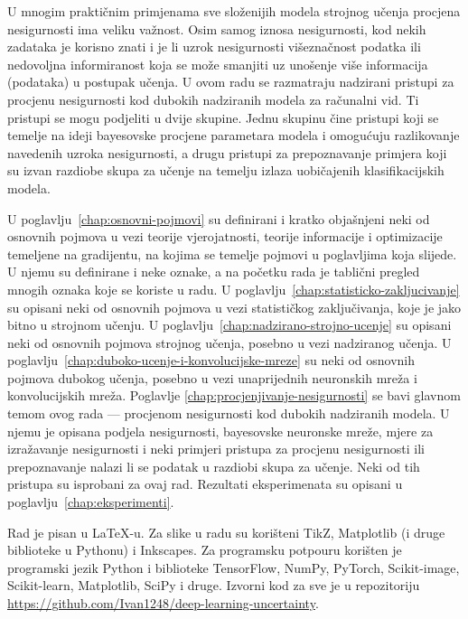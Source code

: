 \documentclass[utf8, diplomski, lmodern]{fer}
\begin{document}
U mnogim praktičnim primjenama sve složenijih modela strojnog učenja procjena nesigurnosti ima veliku važnost. Osim samog iznosa nesigurnosti, kod nekih zadataka je korisno znati i je li uzrok nesigurnosti višeznačnost podatka ili nedovoljna informiranost koja se može smanjiti uz unošenje više informacija (podataka) u postupak učenja. U ovom radu se razmatraju nadzirani pristupi za procjenu nesigurnosti kod dubokih nadziranih modela za računalni vid. Ti pristupi se mogu podjeliti u dvije skupine. Jednu skupinu čine pristupi koji se temelje na ideji bayesovske procjene parametara modela i omogućuju razlikovanje navedenih uzroka nesigurnosti, a drugu pristupi za prepoznavanje primjera koji su izvan razdiobe skupa za učenje na temelju izlaza uobičajenih klasifikacijskih modela.

U poglavlju~\ref{chap:osnovni-pojmovi} su definirani i kratko objašnjeni neki od osnovnih pojmova u vezi teorije vjerojatnosti, teorije informacije i optimizacije temeljene na gradijentu, na kojima se temelje pojmovi u poglavljima koja slijede. U njemu su definirane i neke oznake, a na početku rada je tablični pregled mnogih oznaka koje se koriste u radu. 
U poglavlju~\ref{chap:statisticko-zakljucivanje} su opisani neki od osnovnih pojmova u vezi statističkog zaključivanja, koje je jako bitno u strojnom učenju.
U poglavlju~\ref{chap:nadzirano-strojno-ucenje} su opisani neki od osnovnih pojmova strojnog učenja, posebno u vezi nadziranog učenja.
U poglavlju~\ref{chap:duboko-ucenje-i-konvolucijske-mreze} su neki od osnovnih pojmova dubokog učenja, posebno u vezi unaprijednih neuronskih mreža i konvolucijskih mreža.
Poglavlje \ref{chap:procjenjivanje-nesigurnosti} se bavi glavnom temom ovog rada --- procjenom nesigurnosti kod dubokih nadziranih modela. U njemu je opisana podjela nesigurnosti, bayesovske neuronske mreže, mjere za izražavanje nesigurnosti i neki primjeri pristupa za procjenu nesigurnosti ili prepoznavanje nalazi li se podatak u razdiobi skupa za učenje. Neki od tih pristupa \citep{Kendall:2017:WUNBDLCV,Hendrycks:2016:BDMOODE,Liang:2017:PDOODENN} su isprobani za ovaj rad. Rezultati eksperimenata su opisani u poglavlju~\ref{chap:eksperimenti}.

Rad je pisan u \LaTeX-u. Za slike u radu su korišteni TikZ, Matplotlib (i druge biblioteke u Pythonu) i Inkscapes. Za programsku potpouru korišten je programski jezik Python i biblioteke TensorFlow, NumPy, PyTorch, Scikit-image, Scikit-learn, Matplotlib, SciPy i druge. Izvorni kod za sve je u repozitoriju \url{https://github.com/Ivan1248/deep-learning-uncertainty}.
\end{document}
